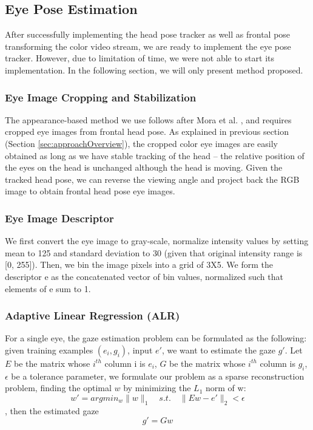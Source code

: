 \subsection{Eye Pose Estimation}
After successfully implementing the head pose tracker as well as frontal pose transforming the color video stream, we are ready to implement the eye pose tracker.  However, due to limitation of time, we were not able to start its implementation.  In the following section, we will only present method proposed.


\subsubsection{Eye Image Cropping and Stabilization}
The appearance-based method we use follows after Mora et al. \cite{funes2013person}, and requires cropped eye images from frontal head pose.  As explained in previous section (Section \ref{sec:approachOverview}), the cropped color eye images are easily obtained as long as we have stable tracking of the head -- the relative position of the eyes on the head is unchanged although the head is moving.  Given the tracked head pose, we can reverse the viewing angle and project back the RGB image to obtain frontal head pose eye images.


\subsubsection{Eye Image Descriptor}
We first convert the eye image to gray-scale, normalize intensity values by setting mean to 125 and standard deviation to 30 (given that original intensity range is [0, 255]).  Then, we bin the image pixels into a grid of 3X5.  We form the descriptor e as the concatenated vector of bin values, normalized such that elements of e sum to 1.


\subsubsection{Adaptive Linear Regression (ALR)}
For a single eye, the gaze estimation problem can be formulated as the following: given training examples \( {(e_i,g_i )} \), input \(e'\), we want to estimate the gaze \(g'\).
Let \(E\) be the matrix whose \(i^{th}\) column i is \( e_i \), \(G\) be the matrix whose \(i^{th}\) column is \(g_i\), \(\epsilon\) be a tolerance parameter, we formulate our problem as a sparse reconstruction problem, finding the optimal \(w\) by minimizing the \(L_1\) norm of w:
\[ w' = argmin_w \|w\|_1  \quad  s.t.   \quad   \|Ew - e'\|_2 < \epsilon   \]
, then the estimated gaze \[ g' = Gw \]


